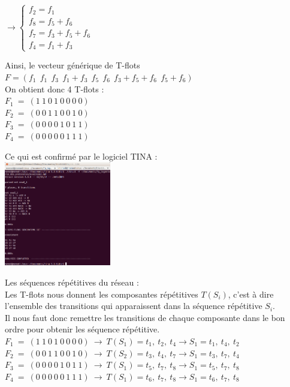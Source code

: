 \begin{center}
\vspace{0.5cm}

$\rightarrow 
\begin{cases}
f_2 = f_1\\
f_8 = f_5 + f_6\\
f_7 = f_3 + f_5 + f_6\\
f_4 = f_1 + f_3
\end{cases}$

\newpage

Ainsi, le vecteur générique de T-flots $F=(f_1\ \ f_1\ \ f_3\ \ f_1+f_3\ \ f_5\ \ f_6\ \ f_3+f_5+f_6\ \ f_5+f_6)$\\
On obtient donc 4 T-flots :\\
$F_1\ =\ (1\ 1\ 0\ 1\ 0\ 0\ 0\ 0)$\\
$F_2\ =\ (0\ 0\ 1\ 1\ 0\ 0\ 1\ 0)$\\
$F_3\ =\ (0\ 0\ 0\ 0\ 1\ 0\ 1\ 1)$\\
$F_4\ =\ (0\ 0\ 0\ 0\ 0\ 1\ 1\ 1)$\\

\vspace{0.5cm}

Ce qui est confirmé par le logiciel TINA :\\
\includegraphics[width=0.35\textwidth]{images/tflots2.png}\\
\end{center}

Les séquences répétitives du réseau :\\
Les T-flots nous donnent les composantes répétitives $T(S_i)$, c'est à dire l’ensemble des
transitions qui apparaissent dans la séquence répétitive $S_i$.\\
Il nous faut donc remettre les transitions de chaque composante dans le bon ordre pour obtenir les séquence répétitive.\\
$F_1\ =\ (1\ 1\ 0\ 1\ 0\ 0\ 0\ 0)\ \rightarrow\ T(S_1) = {t_1,\ t_2,\ t_4} \rightarrow S_1 =t_1,\ t_4,\ t_2$\\
$F_2\ =\ (0\ 0\ 1\ 1\ 0\ 0\ 1\ 0)\ \rightarrow\ T(S_2) = {t_3,\ t_4,\ t_7} \rightarrow S_1 =t_3,\ t_7,\ t_4$\\
$F_3\ =\ (0\ 0\ 0\ 0\ 1\ 0\ 1\ 1)\ \rightarrow\ T(S_1) = {t_5,\ t_7,\ t_8} \rightarrow S_1 =t_5,\ t_7,\ t_8$\\
$F_4\ =\ (0\ 0\ 0\ 0\ 0\ 1\ 1\ 1)\ \rightarrow\ T(S_1) = {t_6,\ t_7,\ t_8} \rightarrow S_1 =t_6,\ t_7,\ t_8$\\


